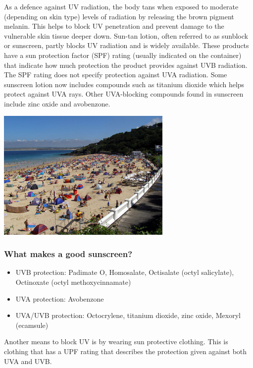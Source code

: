 \label{m38779*id189495}As a defence against UV radiation, the body tans when exposed to moderate (depending on skin type) levels of radiation by releasing the brown pigment melanin. This helps to block UV penetration and prevent damage to the vulnerable skin tissue deeper down. Sun-tan lotion, often referred to as sunblock or sunscreen, partly blocks UV radiation and is widely available. These products have a sun protection factor (SPF) rating (usually indicated on the container) that indicate how much protection the product provides against UVB radiation. The SPF rating does not specify protection against UVA radiation. Some sunscreen lotion now includes compounds such as titanium dioxide which helps protect against UVA rays. Other UVA-blocking compounds found in sunscreen include zinc oxide and avobenzone.\par 
\label{m38779*secfhsst!!!underscore!!!id701}
\begin{minipage}{.5\textwidth}
\includegraphics[width=.8\columnwidth]{photos/beach2_treehouse1977.jpg}
\end{minipage}
\begin{minipage}{.5\textwidth}
            \subsubsection*{What makes a good sunscreen? }
            \nopagebreak
        \label{m38779*id189518}\begin{itemize}[noitemsep]
            \label{m38779*uid18}\item UVB protection: Padimate O, Homosalate, Octisalate (octyl salicylate), Octinoxate (octyl methoxycinnamate)
\label{m38779*uid19}\item UVA protection: Avobenzone
\label{m38779*uid20}\item UVA/UVB protection: Octocrylene, titanium dioxide, zinc oxide, Mexoryl (ecamsule)
\end{itemize}
        \label{m38779*id189561}Another means to block UV is by wearing sun protective clothing. This is clothing that has a UPF rating that describes the protection given against both UVA and UVB. \par 
      \label{m38779*uid21}
\end{minipage}
